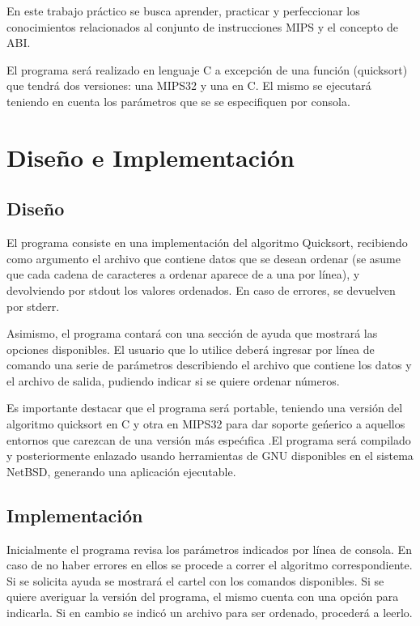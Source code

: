 \documentclass[a4paper,10pt]{article}
\numberwithin{equation}{section}
\numberwithin{figure}{section}
\begin{document}
En este trabajo práctico se busca aprender, practicar y perfeccionar los conocimientos relacionados al conjunto de instrucciones MIPS y el concepto de ABI.

El programa será realizado en lenguaje C a excepción de una función (quicksort) que tendrá dos versiones: una MIPS32 y una en C. El mismo se ejecutará teniendo en cuenta los parámetros que se se especifiquen por consola.



\section{Diseño e Implementación}

\subsection{Diseño}

El programa consiste en una implementación del algoritmo Quicksort, recibiendo como argumento el archivo que contiene datos que se desean ordenar (se asume que cada cadena de caracteres a ordenar aparece de a una por línea), y devolviendo por stdout los valores ordenados. En caso de errores, se devuelven por stderr.

Asimismo, el programa contará con una sección de ayuda que mostrará las opciones disponibles. El usuario que lo utilice deberá ingresar por línea de comando una serie de parámetros describiendo el archivo que contiene los datos y el archivo de salida, pudiendo indicar si se quiere ordenar números.

Es importante destacar que el programa será portable, teniendo una versión del algoritmo quicksort en C y otra en MIPS32 para dar soporte geńerico a aquellos entornos que carezcan de una versión
más espećıfica .El programa será compilado y posteriormente enlazado usando herramientas de GNU disponibles en el sistema NetBSD, generando una aplicación ejecutable.


\subsection{Implementación}

Inicialmente el programa revisa los parámetros indicados por línea de consola. En caso de no haber errores en ellos se procede a correr el algoritmo correspondiente. Si se solicita ayuda se mostrará el cartel con los comandos disponibles. Si se quiere averiguar la versión del programa, el mismo cuenta con una opción para indicarla. Si en cambio se indicó un archivo para ser ordenado, procederá a leerlo.
\end{document}
